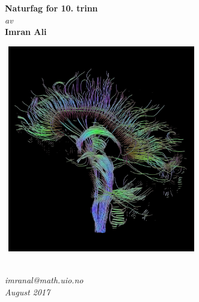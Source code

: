 \documentclass[main.tex]{subfiles}
\begin{document}
\thispagestyle{empty}
\begin{center}        %
  \vspace{5mm}        %
  \LARGE
  \textbf{Naturfag for 10. trinn} \\
  \Large
  \vspace{10mm}
  \textsl{av} \\
  \vspace{2mm}
  \large
  \textbf{Imran Ali} \\
  \vspace{15mm}
  \centerline{\includegraphics[width=85mm,height=90mm]{../figures/DTI-mri_wikipedia.jpg}} 
  \vspace{10mm}
  \textsl{} \\
  \textsl{imranal@math.uio.no} \\
  \vspace{5mm}
  \large
  \textsl{August 2017} \\
  \vspace{2cm}
\end{center}
\end{document}
